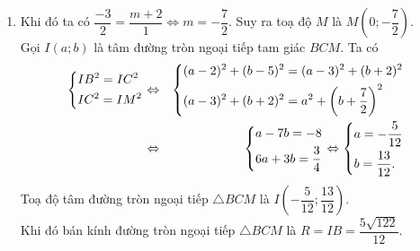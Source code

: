 \begin{bt}
{{
			}
		\begin{enumerate}
			\item[] Khi đó ta có $\dfrac{-3}{2}=\dfrac{m+2}{1} \Leftrightarrow m=-\dfrac{7}{2}$. Suy ra toạ độ $M$ là $M\left(0;-\dfrac{7}{2}\right)$.\\
			Gọi $I(a;b)$ là tâm đường tròn ngoại tiếp tam giác $BCM$. Ta có
			\begin{eqnarray*}
				\left\{\begin{aligned}&IB^2=IC^2 \\ &IC^2=IM^2\end{aligned}\right. &\Leftrightarrow& \left\{\begin{aligned}&(a-2)^2+(b-5)^2=(a-3)^2+(b+2)^2 \\ &(a-3)^2+(b+2)^2=a^2+\left(b+\dfrac{7}{2}\right)^2\end{aligned}\right. \\
				&\Leftrightarrow& \left\{\begin{aligned}&a-7b=-8 \\ &6a+3b=\dfrac{3}{4}\end{aligned}\right. \Leftrightarrow \left\{\begin{aligned}&a=-\dfrac{5}{12} \\ &b=\dfrac{13}{12}.\end{aligned}\right.
			\end{eqnarray*}
			Toạ độ tâm đường tròn ngoại tiếp $\triangle BCM$ là $I\left(-\dfrac{5}{12};\dfrac{13}{12}\right)$.\\
			Khi đó bán kính đường tròn ngoại tiếp $\triangle BCM$ là $R=IB=\dfrac{5\sqrt{122}}{12}$.
		\end{enumerate}
	}
\end{bt}

